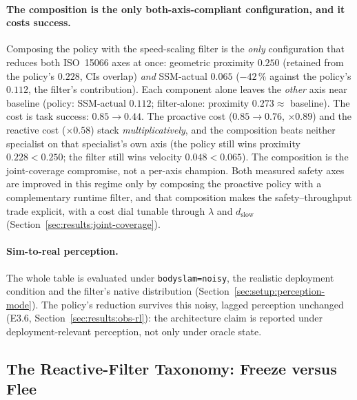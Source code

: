 \documentclass[11pt,a4paper]{report}
\newcommand{\ssm}{SSM}
\newcommand{\iso}{ISO~15066}
\begin{document}
\paragraph{The composition is the only both-axis-compliant
configuration, and it costs success.}
Composing the policy with the speed-scaling filter is the \emph{only}
configuration that reduces both \iso{} axes at once: geometric
proximity $0.250$ (retained from the policy's $0.228$, CIs overlap)
\emph{and} \ssm{}-actual $0.065$ ($-42\,\%$ against the policy's
$0.112$, the filter's contribution). Each component alone leaves the
\emph{other} axis near baseline (policy: \ssm{}-actual $0.112$;
filter-alone: proximity $0.273 \approx$ baseline). The cost is task
success: $0.85 \rightarrow 0.44$. The proactive cost ($0.85 \to 0.76$,
$\times 0.89$) and the reactive cost ($\times 0.58$) stack
\emph{multiplicatively}, and the composition beats neither specialist
on that specialist's own axis (the policy still wins proximity
$0.228 < 0.250$; the filter still wins velocity $0.048 < 0.065$). The
composition is the joint-coverage compromise, not a per-axis champion.
Both measured safety axes are improved in this regime only by composing
the proactive policy with a complementary runtime filter, and that
composition makes the safety--throughput trade explicit, with a cost
dial tunable through $\lambda$ and $d_{\mathrm{slow}}$
(Section~\ref{sec:results:joint-coverage}).

\paragraph{Sim-to-real perception.}
The whole table is evaluated under \texttt{bodyslam=noisy}, the
realistic deployment condition and the filter's native distribution
(Section~\ref{sec:setup:perception-mode}). The policy's reduction
survives this noisy, lagged perception unchanged (E3.6,
Section~\ref{sec:results:obs-rl}): the architecture claim is reported
under deployment-relevant perception, not only under oracle state.

\subsection{The Reactive-Filter Taxonomy: Freeze versus Flee}
\label{sec:results:reactive-taxonomy}
\end{document}
